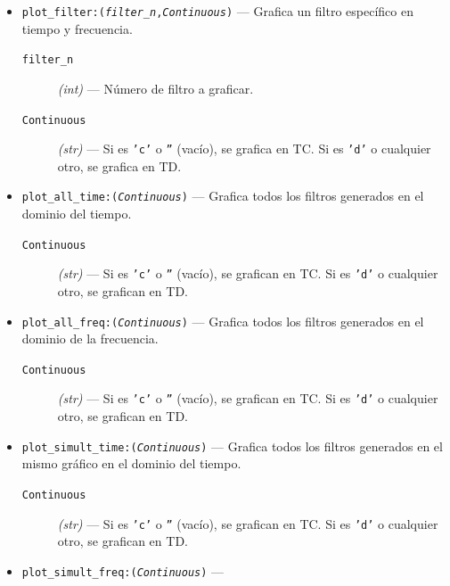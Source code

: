\begin{itemize}
\begin{description}
                Si es \texttt{'d'} o cualquier otro, se grafica en TD.
        \end{description}
    \item \texttt{plot\_filter:(\textit{filter\_n},\textit{Continuous})} ---
    Grafica un filtro específico en tiempo y frecuencia.
        \begin{description}
            \item[\texttt{filter\_n}] \textit{(int)} --- 
                Número de filtro a graficar.
            \item[\texttt{Continuous}] \textit{(str)} ---
                Si es \texttt{'c'} o \texttt{''} (vacío), se grafica en TC.
                Si es \texttt{'d'} o cualquier otro, se grafica en TD.
        \end{description}
    \item \texttt{plot\_all\_time:(\textit{Continuous})} ---
    Grafica todos los filtros generados en el dominio del tiempo.
        \begin{description}
            \item[\texttt{Continuous}] \textit{(str)} ---
                Si es \texttt{'c'} o \texttt{''} (vacío), se grafican en TC.
                Si es \texttt{'d'} o cualquier otro, se grafican en TD.
        \end{description}
    \item \texttt{plot\_all\_freq:(\textit{Continuous})} ---
    Grafica todos los filtros generados en el dominio de la frecuencia.
        \begin{description}
            \item[\texttt{Continuous}] \textit{(str)} ---
                Si es \texttt{'c'} o \texttt{''} (vacío), se grafican en TC.
                Si es \texttt{'d'} o cualquier otro, se grafican en TD.
        \end{description}
    \item \texttt{plot\_simult\_time:(\textit{Continuous})} ---
    Grafica todos los filtros generados en el mismo gráfico en el dominio del tiempo.
        \begin{description}
            \item[\texttt{Continuous}] \textit{(str)} ---
                Si es \texttt{'c'} o \texttt{''} (vacío), se grafican en TC.
                Si es \texttt{'d'} o cualquier otro, se grafican en TD.
        \end{description}
    \item \texttt{plot\_simult\_freq:(\textit{Continuous})} ---

\end{itemize}
